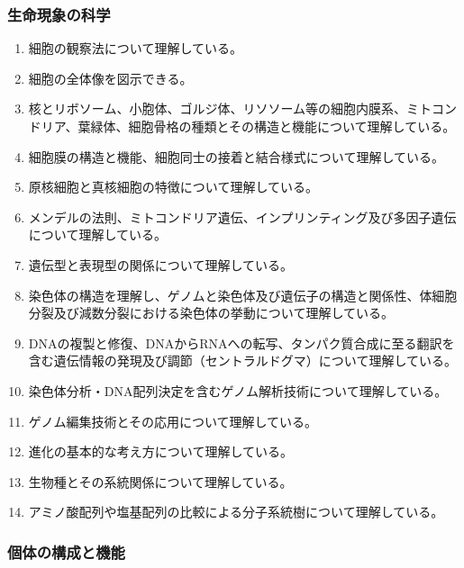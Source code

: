\hypertarget{ux751fux547dux73feux8c61ux306eux79d1ux5b66}{%
\subsubsection{生命現象の科学}\label{ux751fux547dux73feux8c61ux306eux79d1ux5b66}}

\begin{enumerate}
\def\labelenumi{\arabic{enumi}.}
\tightlist
\item
  細胞の観察法について理解している。
\item
  細胞の全体像を図示できる。
\item
  核とリボソーム、小胞体、ゴルジ体、リソソーム等の細胞内膜系、ミトコンドリア、葉緑体、細胞骨格の種類とその構造と機能について理解している。
\item
  細胞膜の構造と機能、細胞同士の接着と結合様式について理解している。
\item
  原核細胞と真核細胞の特徴について理解している。
\item
  メンデルの法則、ミトコンドリア遺伝、インプリンティング及び多因子遺伝について理解している。
\item
  遺伝型と表現型の関係について理解している。
\item
  染色体の構造を理解し、ゲノムと染色体及び遺伝子の構造と関係性、体細胞分裂及び減数分裂における染色体の挙動について理解している。
\item
  DNAの複製と修復、DNAからRNAへの転写、タンパク質合成に至る翻訳を含む遺伝情報の発現及び調節（セントラルドグマ）について理解している。
\item
  染色体分析・DNA配列決定を含むゲノム解析技術について理解している。
\item
  ゲノム編集技術とその応用について理解している。
\item
  進化の基本的な考え方について理解している。
\item
  生物種とその系統関係について理解している。
\item
  アミノ酸配列や塩基配列の比較による分子系統樹について理解している。
\end{enumerate}

\hypertarget{ux500bux4f53ux306eux69cbux6210ux3068ux6a5fux80fd}{%
\subsubsection{個体の構成と機能}\label{ux500bux4f53ux306eux69cbux6210ux3068ux6a5fux80fd}}

